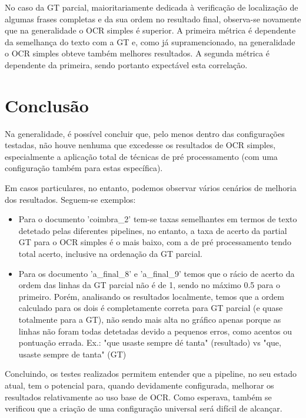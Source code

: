 No caso da GT parcial, maioritariamente dedicada à verificação de localização de algumas frases completas e da sua ordem no resultado final, observa-se novamente que na generalidade o OCR simples é superior. A primeira métrica é dependente da semelhança do texto com a GT e, como já supramencionado, na generalidade o OCR simples obteve também melhores resultados.  A segunda métrica é dependente da primeira, sendo portanto expectável esta correlação. 


\section{Conclusão}

Na generalidade, é possível concluir que, pelo menos dentro das configurações testadas, não houve nenhuma que excedesse os resultados de OCR simples, especialmente a aplicação total de técnicas de pré processamento (com uma configuração também para estas específica).

Em casos particulares, no entanto, podemos observar vários cenários de melhoria dos resultados.
Seguem-se exemplos:

\begin{itemize}
	\item Para o documento 'coimbra\_2' tem-se taxas semelhantes em termos de texto detetado pelas diferentes pipelines, no entanto, a taxa de acerto da partial GT para o OCR simples é o mais baixo, com a de pré processamento tendo total acerto, inclusive na ordenação da GT parcial.
	
	\item Para os documento 'a\_final\_8' e 'a\_final\_9' temos que o rácio de acerto da ordem das linhas da GT parcial não é de 1, sendo no máximo 0.5 para o primeiro. Porém, analisando os resultados localmente, temos que a ordem calculado para os dois é completamente correta para GT parcial (e quase totalmente para a GT), não sendo mais alta no gráfico apenas porque as linhas não foram todas detetadas devido a pequenos erros, como acentos ou pontuação errada. Ex.: "que usaste sempre dé tanta" (resultado) vs "que, usaste sempre de tanta" (GT)
	
\end{itemize}



Concluindo, os testes realizados permitem entender que a pipeline, no seu estado atual, tem o potencial para, quando devidamente configurada, melhorar os resultados relativamente ao uso base de OCR. Como esperava, também se verificou que a criação de uma configuração universal será difícil de alcançar. 

